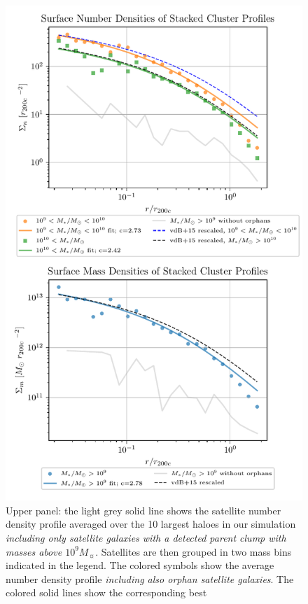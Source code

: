 \documentclass[a4paper,twocolumn,fleqn,usenatbib]{mnras}
\newcommand{\msol}{M_{\sun}}
\begin{document}
\begin{figure}
  \centering
  \includegraphics[width=\linewidth, keepaspectratio]{images/radial-profiles.pdf}%
  \caption{Upper panel: the light grey  solid line shows the satellite
    number density profile averaged over  the 10 largest haloes in our
    simulation {\it including only  satellite galaxies with a detected
    parent clump with masses above $10^9 \msol$}.   Satellites are  
    then grouped  in two  mass bins
    indicated in  the legend.   The colored  symbols show  the average
    number  density  profile  {\it  including  also  orphan  satellite
      galaxies}.  The colored solid  lines show the corresponding best
}
\end{figure}
\end{document}
